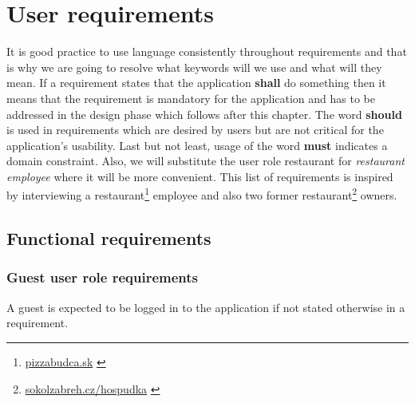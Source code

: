 \newpage

\section{User requirements}
It is good practice to use language consistently throughout requirements and that is why we are going to resolve what keywords will we use and what will they mean.
If a requirement states that the application \textbf{shall} do something then it means that the requirement is mandatory for the application and has to be addressed in the design phase which follows after this chapter. 
The word \textbf{should} is used in requirements which are desired by users but are not critical for the application's usability.
Last but not least, usage of the word \textbf{must} indicates a domain constraint.
Also, we will substitute the user role restaurant for \emph{restaurant employee} where it will be more convenient.
This list of requirements is inspired by interviewing a restaurant\footnote{\url{pizzabudca.sk}  \label{fnlabel}} employee and also two former restaurant\footnote{\url{sokolzabreh.cz/hospudka}  \label{fnlabel}} owners.

\subsection{Functional requirements}
\subsubsection{Guest user role requirements}
A guest is expected to be logged in to the application if not stated otherwise in a requirement.

